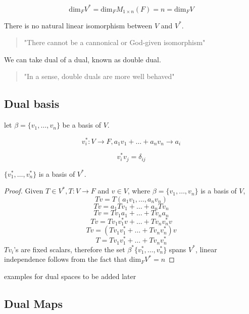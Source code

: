 \documentclass[11pt,a4paper]{colorart}
\def\l{\left}
\def\r{\right}
\def\b{\beta}
\begin{document}
\[ \text{dim}_F V^* = \text{dim}_F M_{1\times n}\l(F\r) = n = \text{dim}_F V \]

There is no natural linear isomorphism between $V$ and $V^*$.

\begin{quote}
	"There cannot be a cannonical or God-given isomorphism"
\end{quote}

We can take dual of a dual, known as double dual.

\begin{quote}
	"In a sense, double duals are more well behaved"
\end{quote}

\subsection{Dual basis}

let $\b = \{v_1,\dots,v_n\}$ be a basis of $V$.

\[ v_i^*: V\rightarrow F, a_1v_1+\dots + a_nv_n\rightarrow a_i \]

\[ v_i^*v_j = \delta_{ij} \]

$\{v_1^*,\dots,v_n^*\}$ is a basis of $V^*$.

\begin{proof}
	Given $T \in V^*, T: V\rightarrow F$ and $v\in V$, where $\b = \{v_1,\dots,v_n\}$ is a basis of $V$,
	\[ Tv = T\l(a_1v_1,\dots,a_nv_n\r) \]
	\[ Tv = a_1Tv_1 + \dots + a_nTv_n \]
	\[ Tv = Tv_1a_1 + \dots + Tv_na_n \]
	\[ Tv = Tv_1v_1^*v + \dots + Tv_nv_n^*v \]
	\[ Tv = \l(Tv_1v_1^* + \dots + Tv_nv_n^*\r)v \]
	\[ T = Tv_1v_1^* + \dots + Tv_nv_n^* \]
	$Tv_i$'s are fixed scalars, therefore the set $\b^*\{v^*_1,\dots,v^*_n\}$ spans $V^*$, linear independence follows from the fact that dim$_FV^*=n$ 

\end{proof}

examples for dual spaces to be added later 

\subsection{Dual Maps}
\end{document}
